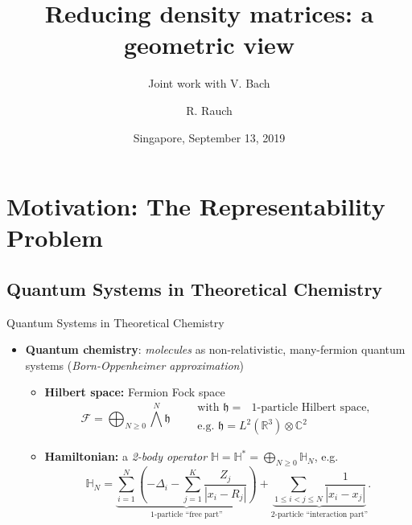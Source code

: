 \documentclass{beamer}
\title{Reducing density matrices: a geometric view}
\subtitle{\hfill Joint work with V. Bach}
\author{R. Rauch}
\date{Singapore, September 13, 2019}
\newcommand{\IR}{\ensuremath{\mathbb{R}}}
\newcommand{\IC}{\ensuremath{\mathbb{C}}}
\newcommand{\HilbertSpace}{\ensuremath{\mathfrak{h}}}
\newcommand{\Hamiltonian}{\mathbb{H}}
\begin{document}
\begin{frame}[plain]
\titlepage
\end{frame}

\section{Motivation: The Representability Problem}
\subsection{Quantum Systems in Theoretical Chemistry}
\frame{\sectionpage}

\begin{frame}{Quantum Systems in Theoretical Chemistry}
    \begin{itemize}
        \item<1-> \textbf{Quantum chemistry}: \emph{molecules} as non-relativistic,
        many-fermion quantum systems (\emph{Born-Oppenheimer approximation})
        \begin{itemize}
            \item<2-> \textbf{Hilbert space:} Fermion Fock space
            \begin{equation}
                \mathcal{F}=\bigoplus_{N\ge 0}\bigwedge^N\HilbertSpace\qquad
                \begin{gathered}
                    \text{with }\HilbertSpace=\text{ $1$-particle Hilbert space},\\
                    \text{e.g. }\HilbertSpace=L^2(\IR^3)\otimes\IC^2
                \end{gathered}
            \end{equation}
            \item<3-> \textbf{Hamiltonian:} a \emph{2-body operator} $\Hamiltonian=\Hamiltonian^*=\bigoplus_{N\ge 0}\Hamiltonian_N$, e.g.
            \begin{equation}
                \Hamiltonian_N=
                \underbrace{\sum_{i=1}^N\left(-\Delta_i-\sum_{j=1}^K\frac{Z_j}{|x_i-R_j|}\right)}_{\text{1-particle ``free part''}}
                +\underbrace{\sum_{1\le i<j\le N}\frac{1}{|x_i-x_j|}}_{\text{2-particle ``interaction part''}}.
            \end{equation}
        \end{itemize}
    \end{itemize}
\end{frame}
\end{document}

